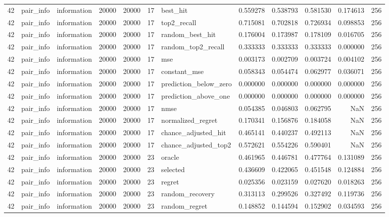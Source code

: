 \begin{tabular}{rllrrrlrrrrr}
42 & pair_info & information & 20000 & 20000 & 17 & best_hit & 0.559278 & 0.538793 & 0.581530 & 0.174613 & 256 \\
42 & pair_info & information & 20000 & 20000 & 17 & top2_recall & 0.715081 & 0.702818 & 0.726934 & 0.098853 & 256 \\
42 & pair_info & information & 20000 & 20000 & 17 & random_best_hit & 0.176004 & 0.173987 & 0.178109 & 0.016705 & 256 \\
42 & pair_info & information & 20000 & 20000 & 17 & random_top2_recall & 0.333333 & 0.333333 & 0.333333 & 0.000000 & 256 \\
42 & pair_info & information & 20000 & 20000 & 17 & mse & 0.003173 & 0.002709 & 0.003724 & 0.004102 & 256 \\
42 & pair_info & information & 20000 & 20000 & 17 & constant_mse & 0.058343 & 0.054474 & 0.062977 & 0.036071 & 256 \\
42 & pair_info & information & 20000 & 20000 & 17 & prediction_below_zero & 0.000000 & 0.000000 & 0.000000 & 0.000000 & 256 \\
42 & pair_info & information & 20000 & 20000 & 17 & prediction_above_one & 0.000000 & 0.000000 & 0.000000 & 0.000000 & 256 \\
42 & pair_info & information & 20000 & 20000 & 17 & nmse & 0.054385 & 0.046803 & 0.062795 & NaN & 256 \\
42 & pair_info & information & 20000 & 20000 & 17 & normalized_regret & 0.170341 & 0.156876 & 0.184058 & NaN & 256 \\
42 & pair_info & information & 20000 & 20000 & 17 & chance_adjusted_hit & 0.465141 & 0.440237 & 0.492113 & NaN & 256 \\
42 & pair_info & information & 20000 & 20000 & 17 & chance_adjusted_top2 & 0.572621 & 0.554226 & 0.590401 & NaN & 256 \\
42 & pair_info & information & 20000 & 20000 & 23 & oracle & 0.461965 & 0.446781 & 0.477764 & 0.131089 & 256 \\
42 & pair_info & information & 20000 & 20000 & 23 & selected & 0.436609 & 0.422065 & 0.451548 & 0.124884 & 256 \\
42 & pair_info & information & 20000 & 20000 & 23 & regret & 0.025356 & 0.023159 & 0.027620 & 0.018263 & 256 \\
42 & pair_info & information & 20000 & 20000 & 23 & random_recovery & 0.313113 & 0.299526 & 0.327492 & 0.119736 & 256 \\
42 & pair_info & information & 20000 & 20000 & 23 & random_regret & 0.148852 & 0.144594 & 0.152902 & 0.034593 & 256 \\

\end{tabular}
